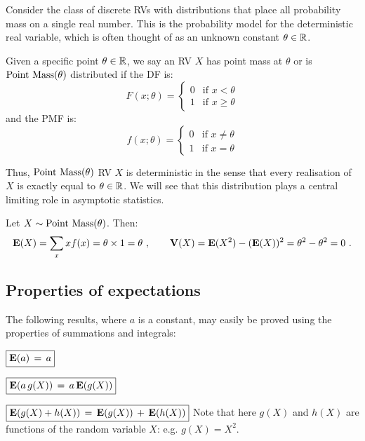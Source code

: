 Consider the class of discrete RVs with distributions that place all probability mass on a single real number.  
This is the probability model for the deterministic real variable, which is often thought of as an unknown constant $\theta \in \mathbb{R}$.
\begin{model}[$\pointmass(\theta)$]
Given a specific point $\theta \in \mathbb{R}$, we say an RV $X$ has point mass at $\theta$ or is $\pointmass(\theta)$ distributed if the DF is:
\begin{equation}\label{E:PointMasscdf}
F(x;\theta) =
\begin{cases}
0 & \text{if $x < \theta$} \\
1 & \text{if $x \geq \theta$}
\end{cases}
\end{equation}
and the PMF is:
\begin{equation}
f(x;\theta) =
\begin{cases}
0 & \text{if  $x \neq \theta$} \\
1 & \text{if $x = \theta$}
\end{cases}
\end{equation}
\end{model}
Thus, $\pointmass(\theta)$ RV $X$ is deterministic in the sense that every realisation of $X$ is exactly equal to $\theta \in \mathbb{R}$.  We will see that this distribution plays a central limiting role in asymptotic statistics.

\begin{example}
Let $X \sim \mbox{{\rm Point~Mass}}(\theta)$.  Then:
\[
\mathbf{E}(X) = \sum_{x} x f(x) = \theta \times 1 = \theta \ , \qquad
\mathbf{V}(X) = \mathbf{E}(X^2) - (\mathbf{E}(X))^2 = \theta^2 - \theta^2 = 0 \ .
\]
\end{example}

\subsection{Properties of expectations}\label{S:PropOfEs}
The following results, where $a$ is a  constant, may easily be
proved using the properties of summations and integrals:

\bit
\item[] $\boxed{\mathbf{E}(a ) \,=\, a}$

\item[] $\boxed{\mathbf{E}(a \,g(X)) \,=\, a\, \mathbf{E}(g(X))}$

\item[] $\boxed{\mathbf{E}(g(X)+h(X))  \,=\, \mathbf{E}(g(X)) \,+\, \mathbf{E}(h(X))}$
\eit
Note that here  $g(X)$ and $h(X)$ are functions of the random variable
$X$: e.g.  $g(X)=X^2$.

